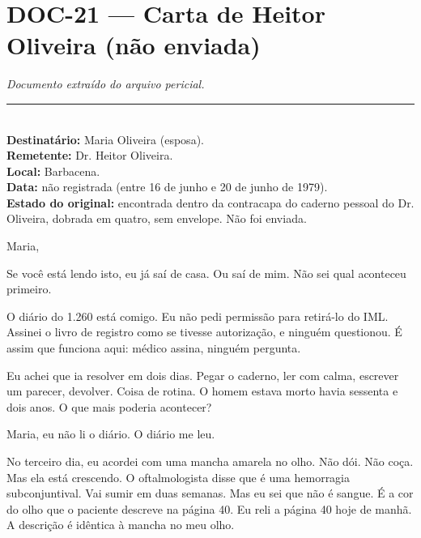 \section*{\textbf{DOC-21} --- Carta de Heitor Oliveira (não enviada)}

\noindent \textit{Documento extraído do arquivo pericial.}

\vspace{0.5em}\noindent\rule{\textwidth}{0.5pt}\vspace{0.5em}

\\[-0.2em]

\noindent \textbf{Destinatário:} Maria Oliveira (esposa).\\
\noindent \textbf{Remetente:} Dr. Heitor Oliveira.\\
\noindent \textbf{Local:} Barbacena.\\
\noindent\textbf{Data:} não registrada (entre 16 de junho e 20 de junho de 1979).\\
\noindent\textbf{Estado do original:} encontrada dentro da contracapa do caderno pessoal do Dr. Oliveira, dobrada em quatro, sem envelope. Não foi enviada.

\noindent Maria,

\noindent Se você está lendo isto, eu já saí de casa. Ou saí de mim. Não sei qual
\noindent aconteceu primeiro.

\noindent O diário do 1.260 está comigo. Eu não pedi permissão para retirá-lo
\noindent do IML. Assinei o livro de registro como se tivesse autorização, e ninguém
\noindent questionou. É assim que funciona aqui: médico assina, ninguém pergunta.

\noindent Eu achei que ia resolver em dois dias. Pegar o caderno, ler com calma,
\noindent escrever um parecer, devolver. Coisa de rotina. O homem estava morto havia
\noindent sessenta e dois anos. O que mais poderia acontecer?

\noindent Maria, eu não li o diário. O diário me leu.

\noindent No terceiro dia, eu acordei com uma mancha amarela no olho. Não dói.
\noindent Não coça. Mas ela está crescendo. O oftalmologista disse que é uma
\noindent hemorragia subconjuntival. Vai sumir em duas semanas. Mas eu sei que não é
\noindent sangue. É a cor do olho que o paciente descreve na página 40. Eu reli a
\noindent página 40 hoje de manhã. A descrição é idêntica à mancha no meu olho.

